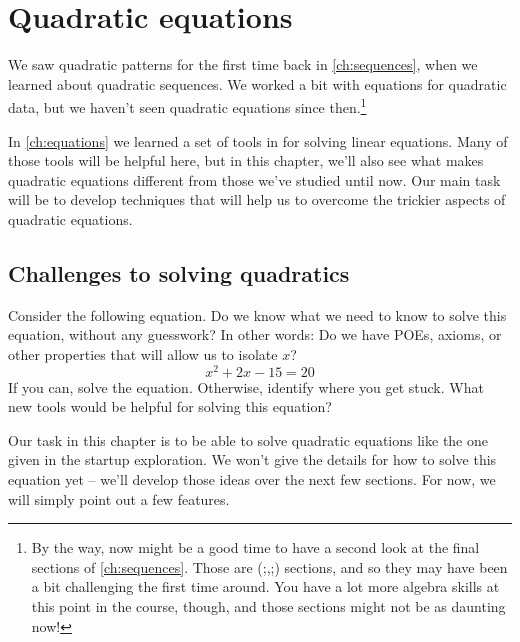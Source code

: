 \chapter{Quadratic equations}
\label{ch:quadeq}


We saw quadratic patterns for the first time back in \cref{ch:sequences}, when we learned about quadratic sequences. We worked a bit with equations for quadratic data, but we haven't seen quadratic equations since then.\footnote{By the way, now might be a good time to have a second look at the final sections of \cref{ch:sequences}. Those are (;,;) sections, and so they may have been a bit challenging the first time around. You have a lot more algebra skills at this point in the course, though, and those sections might not be as daunting now!}

In \cref{ch:equations} we learned a set of tools in for solving linear equations. Many of those tools will be helpful here, but in this chapter, we'll also see what makes quadratic equations different from those we've studied until now. Our main task will be to develop techniques that will help us to overcome the trickier aspects of quadratic equations.

\section{Challenges to solving quadratics}

\begin{boxexplore}
Consider the following equation. Do we know what we need to know to solve this equation, without any guesswork? In other words: Do we have POEs, axioms, or other properties that will allow us to isolate $x$?
\[x^2 + 2x - 15 = 20\]
If you can, solve the equation. Otherwise, identify where you get stuck. What new tools would be helpful for solving this equation?
\end{boxexplore}

Our task in this chapter is to be able to solve quadratic equations like the one given in the startup exploration. We won't give the details for how to solve this equation yet -- we'll develop those ideas over the next few sections. For now, we will simply point out a few features.

